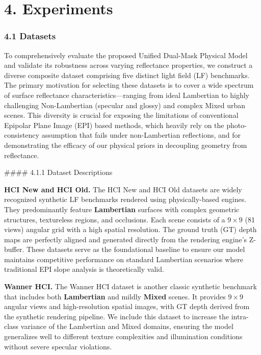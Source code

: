 \section{4. Experiments}

\subsubsection{4.1 Datasets}

To comprehensively evaluate the proposed Unified Dual-Mask Physical Model and validate its robustness across varying reflectance properties, we construct a diverse composite dataset comprising five distinct light field (LF) benchmarks. The primary motivation for selecting these datasets is to cover a wide spectrum of surface reflectance characteristics—ranging from ideal Lambertian to highly challenging Non-Lambertian (specular and glossy) and complex Mixed urban scenes. This diversity is crucial for exposing the limitations of conventional Epipolar Plane Image (EPI) based methods, which heavily rely on the photo-consistency assumption that fails under non-Lambertian reflections, and for demonstrating the efficacy of our physical priors in decoupling geometry from reflectance.

\#\#\#\# 4.1.1 Dataset Descriptions

\textbf{HCI New and HCI Old.} The HCI New and HCI Old datasets are widely recognized synthetic LF benchmarks rendered using physically-based engines. They predominantly feature \textbf{Lambertian} surfaces with complex geometric structures, textureless regions, and occlusions. Each scene consists of a $9 \times 9$ (81 views) angular grid with a high spatial resolution. The ground truth (GT) depth maps are perfectly aligned and generated directly from the rendering engine's Z-buffer. These datasets serve as the foundational baseline to ensure our model maintains competitive performance on standard Lambertian scenarios where traditional EPI slope analysis is theoretically valid.

\textbf{Wanner HCI.} The Wanner HCI dataset is another classic synthetic benchmark that includes both \textbf{Lambertian} and mildly \textbf{Mixed} scenes. It provides $9 \times 9$ angular views and high-resolution spatial images, with GT depth derived from the synthetic rendering pipeline. We include this dataset to increase the intra-class variance of the Lambertian and Mixed domains, ensuring the model generalizes well to different texture complexities and illumination conditions without severe specular violations.

